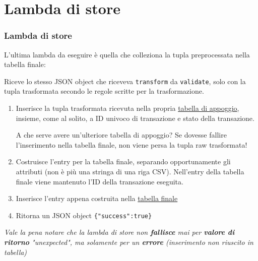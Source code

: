 \documentclass{beamer}
\begin{document}
\section{Lambda di store}
\begin{frame}
    \frametitle{Lambda di store}

    \fontsize{10pt}{10pt}\selectfont

    L'ultima lambda da eseguire è quella che colleziona la tupla preprocessata nella tabella finale:

    Riceve lo stesso JSON object che riceveva \texttt{transform} da \texttt{validate}, solo con la tupla trasformata
    secondo le regole scritte per la trasformazione.
    
    \begin{enumerate}
        \item Inserisce la tupla trasformata ricevuta nella propria \underline{tabella di appoggio}, insieme, come 
        al solito, a ID univoco di transazione e stato della transazione.
        \begin{alertblock}{A che serve avere un'ulteriore tabella di appoggio?}
        Se dovesse fallire l'inserimento nella tabella finale, non viene persa la tupla raw trasformata!
        \end{alertblock}
        \item Costruisce l'entry per la tabella finale, separando opportunamente gli attributi (non è più una
        stringa di una riga CSV). Nell'entry della tabella finale viene mantenuto l'ID della transazione eseguita.
        \item Inserisce l'entry appena costruita nella \underline{tabella finale}
        \item Ritorna un JSON object \texttt{\{\;"success"\;:\;true\;\}}
    \end{enumerate}

    \fontsize{7pt}{10pt}\selectfont
    \textit{Vale la pena notare che la lambda di store non \textbf{fallisce} mai per \textbf{valore di ritorno} "unexpected", ma solamente per un \textbf{errore} (inserimento non riuscito in tabella)}
\end{frame}
\end{document}
